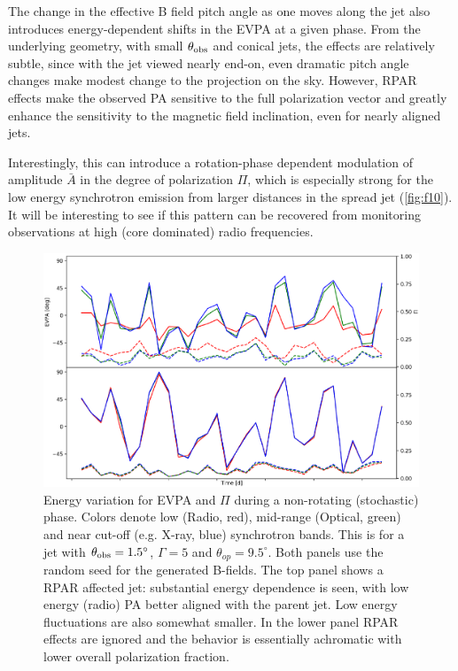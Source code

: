 The change in the effective B field pitch angle as one moves along the jet also introduces energy-dependent shifts in the EVPA at a given phase. From the underlying geometry, with small $\theta_{\rm obs}$ and conical jets, the effects are relatively subtle, since with the jet viewed nearly end-on, even dramatic pitch angle changes make modest change to the projection on the sky. However, RPAR effects make the observed PA sensitive to the full polarization vector and greatly enhance the sensitivity to the magnetic field inclination, even for nearly aligned jets.

Interestingly, this can introduce a rotation-phase dependent modulation of amplitude ${\bar A}$ in the degree of polarization $\Pi$, which is especially strong for the low energy synchrotron emission from larger distances in the spread jet (\cref{fig:f10}). It will be interesting to see if this pattern can be recovered from monitoring observations at high (core dominated) radio frequencies.

\begin{figure}[t]
\includegraphics[width=0.8\linewidth]{figures/f9.eps}
\centering
\caption{Energy variation for EVPA and $\Pi$ during a non-rotating (stochastic) phase. Colors denote low (Radio, red), mid-range (Optical, green) and near cut-off (e.g. X-ray, blue) synchrotron bands. This is for a jet with $\theta_{\rm obs} = 1.5^{\circ}$, $\Gamma = 5$ and $\theta_{op} = 9.5^{\circ}$. Both panels use the random seed for the generated B-fields. The top panel shows a RPAR affected jet: substantial energy dependence is seen, with low energy (radio) PA better aligned with the parent jet. Low energy fluctuations are also somewhat smaller. In the lower panel RPAR effects are ignored and the behavior is essentially achromatic with lower overall polarization fraction.}
\label{fig:f9}
\end{figure}

